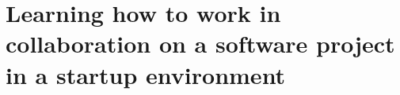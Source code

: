 \chapter{Learning how to work in collaboration on a software project in a startup environment}
\label{ch:startup}
